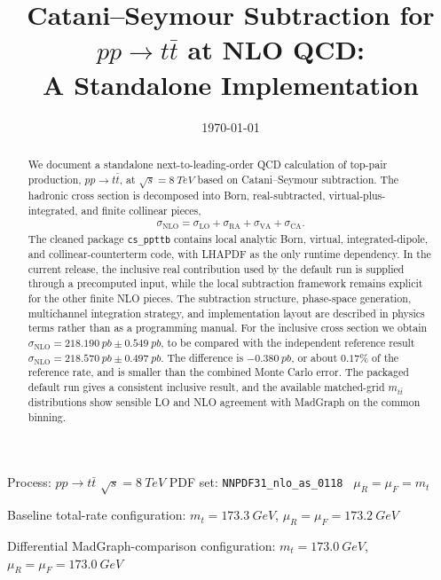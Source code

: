 \documentclass[11pt]{article}
\title{Catani--Seymour Subtraction for $pp \to t\bar t$ at NLO QCD:\\A Standalone Implementation}
\author{}
\date{\today}
\begin{document}
\maketitle

\begin{center}
Process: $pp \to t\bar t$ \hspace{1em}
$\sqrt{s}=\SI{8}{TeV}$ \hspace{1em}
PDF set: \texttt{NNPDF31\_nlo\_as\_0118}~\cite{NNPDF31} \hspace{1em}
$\mu_R=\mu_F=m_t$

\vspace{0.5em}
Baseline total-rate configuration: $m_t=\SI{173.3}{GeV}$, $\mu_R=\mu_F=\SI{173.2}{GeV}$

Differential MadGraph-comparison configuration: $m_t=\SI{173.0}{GeV}$, $\mu_R=\mu_F=\SI{173.0}{GeV}$
\end{center}

\begin{abstract}
We document a standalone next-to-leading-order QCD calculation of top-pair production,
$pp \to t\bar t$, at $\sqrt{s}=\SI{8}{TeV}$ based on Catani--Seymour subtraction.
The hadronic cross section is decomposed into Born, real-subtracted, virtual-plus-integrated,
and finite collinear pieces,
\begin{align}
\sigma_{\text{NLO}} = \sigma_{\text{LO}} + \sigma_{\text{RA}} + \sigma_{\text{VA}} + \sigma_{\text{CA}}.
\end{align}
The cleaned package \texttt{cs\_ppttb} contains local analytic Born, virtual, integrated-dipole,
and collinear-counterterm code, with LHAPDF as the only runtime dependency.
In the current release, the inclusive real contribution used by the default run is supplied through a precomputed input,
while the local subtraction framework remains explicit for the other finite NLO pieces.
The subtraction structure, phase-space generation, multichannel integration strategy,
and implementation layout are described in physics terms rather than as a programming manual.
For the inclusive cross section we obtain
$\sigma_{\text{NLO}} = \SI{218.190}{pb} \pm \SI{0.549}{pb}$,
to be compared with the independent reference result
$\sigma_{\text{NLO}} = \SI{218.570}{pb} \pm \SI{0.497}{pb}$.
The difference is $-\SI{0.380}{pb}$, or about $0.17\%$ of the reference rate, and is smaller than the combined Monte Carlo error.
The packaged default run gives a consistent inclusive result, and the available matched-grid
$m_{t\bar t}$ distributions show sensible LO and NLO agreement with MadGraph on the common binning.
\end{abstract}
\end{document}
